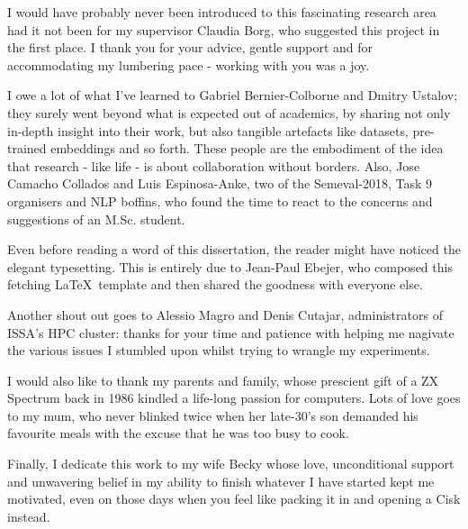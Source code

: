 \begin{acknowledgements}
I would have probably never been introduced to this fascinating research area had it not been for my supervisor Claudia Borg, who suggested this project in the first place.  I thank you for your advice, gentle support and for accommodating my lumbering pace - working with you was a joy.

I owe a lot of what I've learned to Gabriel Bernier-Colborne and Dmitry Ustalov; they surely went beyond what is expected out of academics, by sharing not only in-depth insight into their work, but also tangible artefacts like datasets, pre-trained embeddings and so forth.  These people are the embodiment of the idea that research - like life - is about collaboration without borders.  Also, Jose Camacho Collados and Luis Espinosa-Anke, two of the Semeval-2018, Task 9 organisers and NLP boffins, who found the time to react to the concerns and suggestions of an M.Sc. student.

Even before reading a word of this dissertation, the reader might have noticed the elegant typesetting.  This is entirely due to Jean-Paul Ebejer, who composed this fetching \LaTeX\ template and then shared the goodness with everyone else.  

Another shout out goes to Alessio Magro and Denis Cutajar, administrators of ISSA's HPC cluster: thanks for your time and patience with helping me nagivate the various issues I stumbled upon whilst trying to wrangle my experiments. 

I would also like to thank my parents and family, whose prescient gift of a ZX Spectrum back in 1986 kindled a life-long passion for computers.  Lots of love goes to my mum, who never blinked twice when her late-30's son demanded his favourite meals with the excuse that he was too busy to cook. 
 
Finally, I dedicate this work to my wife Becky whose love, unconditional support and unwavering belief in my ability to finish whatever I have started kept me motivated, even on those days when you feel like packing it in and opening a Cisk instead.
\end{acknowledgements}